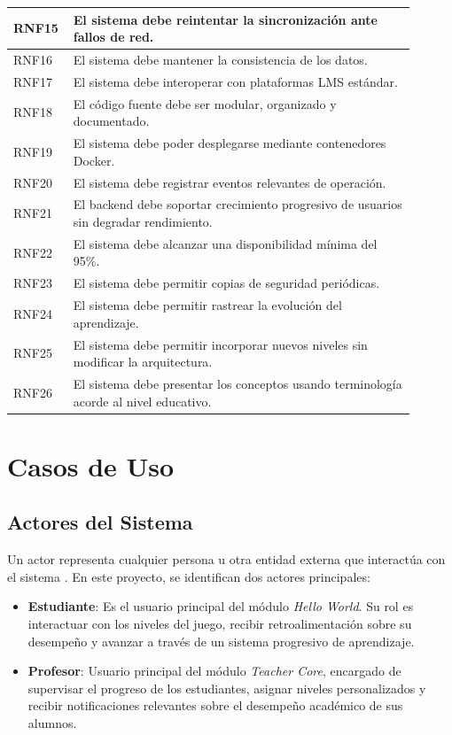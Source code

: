\begin{longtable}{|p{0.1\linewidth}|p{0.8\linewidth}|}
RNF15 & El sistema debe reintentar la sincronización ante fallos de red. \\
\hline
RNF16 & El sistema debe mantener la consistencia de los datos. \\
\hline
RNF17 & El sistema debe interoperar con plataformas LMS estándar. \\
\hline
RNF18 & El código fuente debe ser modular, organizado y documentado. \\
\hline
RNF19 & El sistema debe poder desplegarse mediante contenedores Docker. \\
\hline
RNF20 & El sistema debe registrar eventos relevantes de operación. \\
\hline
RNF21 & El backend debe soportar crecimiento progresivo de usuarios sin degradar rendimiento. \\
\hline
RNF22 & El sistema debe alcanzar una disponibilidad mínima del 95\%. \\
\hline
RNF23 & El sistema debe permitir copias de seguridad periódicas. \\
\hline
RNF24 & El sistema debe permitir rastrear la evolución del aprendizaje. \\
\hline
RNF25 & El sistema debe permitir incorporar nuevos niveles sin modificar la arquitectura. \\
\hline
RNF26 & El sistema debe presentar los conceptos usando terminología acorde al nivel educativo. \\
\hline

\end{longtable}



\section{Casos de Uso}

\subsection{Actores del Sistema}

Un actor representa cualquier persona u otra entidad externa que interactúa con el sistema  \cite{sommerville_software_2011,pressman_ingenierisoftware_2013}. En este proyecto, se identifican dos actores principales:

\begin{itemize}
	\item \textbf{Estudiante}: Es el usuario principal del módulo \textit{Hello World}. Su rol es interactuar con los niveles del juego, recibir retroalimentación sobre su desempeño y avanzar a través de un sistema progresivo de aprendizaje.
	
	\item \textbf{Profesor}: Usuario principal del módulo \textit{Teacher Core}, encargado de supervisar el progreso de los estudiantes, asignar niveles personalizados y recibir notificaciones relevantes sobre el desempeño académico de sus alumnos.
\end{itemize}

